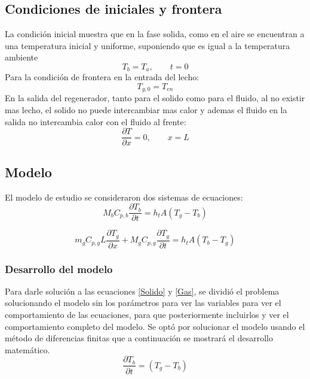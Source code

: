 \documentclass[12pt,letterpaper,final]{article}%
\begin{document}
\subsection{Condiciones de iniciales y frontera}
La condición inicial muestra que en la fase solida, como en el aire se encuentran a una temperatura inicial y uniforme, suponiendo que es igual a la temperatura ambiente
\begin{equation}
	T_b=T_a , \qquad t=0
\end{equation} 
Para la condición de frontera en la entrada del lecho:
\begin{equation}
	T_{g,0}=T_{en}
\end{equation}
En la salida del regenerador, tanto para el solido como para el fluido, al no existir mas lecho, el solido no puede intercambiar mas calor y ademas el fluido en la salida no intercambia calor con el fluido al frente:
\begin{equation}\label{Solido}
	\frac{\partial T}{\partial x} = 0, \qquad x=L
\end{equation}
\subsection{Modelo}
El modelo de estudio se consideraron dos sistemas de ecuaciones:
\begin{equation}\label{Gas}
	M_b C_{p,b}\frac{\partial T_b}{\partial t} = h_t A (T_g - T_b) 
\end{equation}
 
\begin{equation}
	m_g C_{p,g} L \frac{\partial T_g}{\partial x} + M_g C_{p,g} \frac{\partial T_g}{\partial t} = h_t A (T_b - T_g) 
\end{equation}
\subsubsection{Desarrollo del modelo}
Para darle solución a las ecuaciones \ref{Solido} y \ref{Gas}, se dividió el problema solucionando el modelo sin los parámetros para ver las variables para ver el comportamiento de las ecuaciones, para que posteriormente incluirlos y ver el comportamiento completo del modelo.
Se optó por solucionar el modelo usando el método de diferencias finitas que a continuación se mostrará el desarrollo matemático.
\newline 
 \begin{equation}
 	\frac{\partial T_b}{\partial t} = (T_g - T_b) 
 \end{equation}
 
\end{document}
